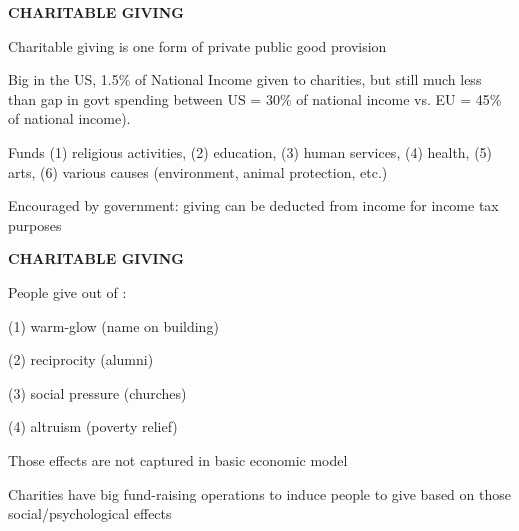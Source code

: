 \documentclass[landscape]{slides}
\begin{document}
\begin{slide}
\begin{center}
{\bf CHARITABLE GIVING}
\end{center}

Charitable giving is one form of private public good  provision 

\small
Big in the US, 1.5\% of National Income given to charities, but still much
less than gap in govt spending between US = 30\% of national income vs. EU = 45\% of national income).
\normalsize

Funds (1) religious activities, (2) education, (3) human services, (4) health,
(5) arts, (6) various causes (environment, animal protection, etc.)

Encouraged by government: giving can be deducted from income for income tax purposes

\end{slide}

\begin{slide}

\end{slide}



\begin{slide}
\begin{center}
{\bf CHARITABLE GIVING}
\end{center}
People give out of :

(1) warm-glow (name on building)

(2) reciprocity (alumni)

(3) social pressure
(churches)

(4) altruism (poverty relief)

Those effects are not captured in basic economic model

Charities have big fund-raising operations to induce people to give based on those social/psychological effects

\end{slide}

%
%
%
%
%
%
%
%
%
\end{document}
